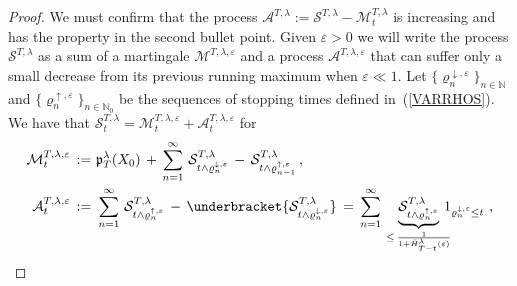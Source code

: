 \documentclass[10pt]{article}
\numberwithin{equation}{section}
\theoremstyle{definition}
\begin{document}
\begin{proof}
We must confirm that the process $\mathcal{A}^{T,\lambda}:=\mathcal{S}^{T,\lambda}-\mathcal{M}_{t}^{T,\lambda}$ is increasing and has the property in the second bullet point.
Given $\varepsilon>0$ we will write the process $\mathcal{S}^{T,\lambda}$   as a sum of a martingale  $\mathcal{M}^{T,\lambda,\varepsilon}$ and a process $\mathcal{A}^{T,\lambda,\varepsilon}$ that can  suffer only a small decrease  from its previous running maximum when $\varepsilon\ll 1$.   Let $\{ \varrho_{n}^{\downarrow,\varepsilon} \}_{n\in \mathbb{N}}$ and $\{ \varrho_{n}^{\uparrow,\varepsilon} \}_{n\in \mathbb{N}_0}$ be the sequences of stopping times defined in~(\ref{VARRHOS}).  We have that $\mathcal{S}_{t}^{T,\lambda}=\mathcal{M}_{t}^{T,\lambda,\varepsilon}+\mathcal{A}_{t}^{T,\lambda,\varepsilon}$ for
\begin{align}\label{AaSum}
\mathcal{M}_{t}^{T,\lambda,\varepsilon}\,:=\,&\,\mathfrak{p}_{T}^{\lambda}(X_0)\,+\,\sum_{n=1}^{\infty}\, \mathcal{S}_{t\wedge \varrho_{n}^{\downarrow,\varepsilon}}^{T,\lambda}\,-\,\mathcal{S}_{t\wedge\varrho_{n-1}^{\uparrow,\varepsilon}}^{T,\lambda} \,, \nonumber \\
\mathcal{A}_{t}^{T,\lambda,\varepsilon}\,:=\,&\,\sum_{n=1}^{\infty}\,\mathcal{S}_{t\wedge \varrho_{n}^{\uparrow,\varepsilon}}^{T,\lambda} \,-\,  \underbracket{\mathcal{S}_{t\wedge \varrho_{n}^{\downarrow,\varepsilon}}^{T,\lambda}}\,=\,\sum_{n=1}^{\infty}\,\underbrace{\mathcal{S}_{t\wedge \varrho_{n}^{\uparrow,\varepsilon}}^{T,\lambda}}_{\leq \, \frac{1}{1+\bar{H}_{T-t}^{\lambda}(\varepsilon)}} \hspace{-.3cm} \, 1_{ \varrho_{n}^{\downarrow,\varepsilon}\leq t } \,\,,
\end{align}

\end{proof}
\end{document}
